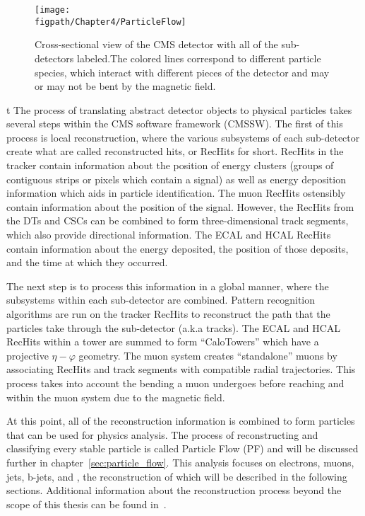 \begin{figure}[!hbt]
    \centering
    \texttt{[image: \\figpath/Chapter4/ParticleFlow]}
    \caption{Cross-sectional view of the CMS detector with all of the sub-detectors labeled.The colored lines correspond to different particle species, which interact with different pieces of the detector and may or may not be bent by the magnetic field.}
    \label{fig:particle_flow}
\end{figure}
t
The process of translating abstract detector objects to physical particles takes several steps within the CMS software framework (CMSSW).
The first of this process is local reconstruction, where the various subsystems of each sub-detector create what are called reconstructed hits, or RecHits for short.
RecHits in the tracker contain information about the position of energy clusters (groups of contiguous strips or pixels which contain a signal) as well as energy deposition information which aids in particle identification.
The muon RecHits ostensibly contain information about the position of the signal.
However, the RecHits from the DTs and CSCs can be combined to form three-dimensional track segments, which also provide directional information.
The ECAL and HCAL RecHits contain information about the energy deposited, the position of those deposits, and the time at which they occurred.

The next step is to process this information in a global manner, where the subsystems within each sub-detector are combined.
Pattern recognition algorithms are run on the tracker RecHits to reconstruct the path that the particles take through the sub-detector (a.k.a tracks).
The ECAL and HCAL RecHits within a tower are summed to form ``CaloTowers'' which have a projective $\eta-\varphi$ geometry.
The muon system creates ``standalone'' muons by associating RecHits and track segments with compatible radial trajectories.
This process takes into account the bending a muon undergoes before reaching and within the muon system due to the magnetic field.

At this point, all of the reconstruction information is combined to form particles that can be used for physics analysis.
The process of reconstructing and classifying every stable particle is called Particle Flow (PF) and will be discussed further in chapter~\ref{sec:particle_flow}.
This analysis focuses on electrons, muons, jets, b-jets, and \ETslash, the reconstruction of which will be described in the following sections.
Additional information about the reconstruction process beyond the scope of this thesis can be found in~\cite{TDR-software}.

